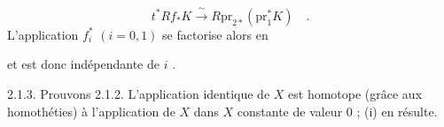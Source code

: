 \begin{equation*}
t^*Rf_* K \xrightarrow{\ \sim\ } R\mathrm{pr}_{2*} (\mathrm{pr}_1^* K) \quad .
\end{equation*}
L'application $f_i^*$ $(i = 0,1)$ se factorise alors en

\begin{center}
\end{center}


 et est donc indépendante de $i$ .

2.1.3. Prouvons 2.1.2. L'application identique de $X$ est homotope (grâce aux homothéties) à l'application de $X$ dans $X$ constante de valeur $0$ ; (i) en résulte.

